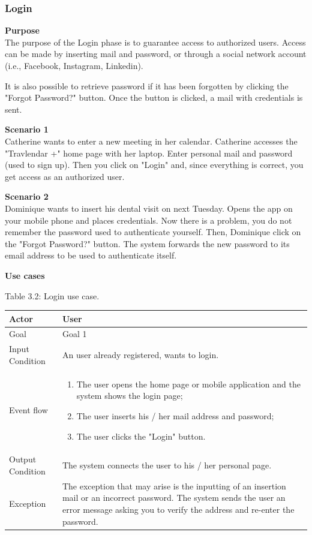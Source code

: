 \documentclass{article}
\begin{document}
	\subsubsection{Login}
	
	\bigskip
	\noindent
	\textbf{Purpose} \\
	The purpose of the Login phase is to guarantee access to authorized users. Access can be made by inserting mail and password, or through a social network account (i.e., Facebook, Instagram, Linkedin).

	It is also possible to retrieve password if it has been forgotten by clicking the "Forgot Password?" button. Once the button is clicked, a mail with credentials is sent.

	\bigskip
	\noindent
	\textbf{Scenario 1} \\
	Catherine wants to enter a new meeting in her calendar. Catherine accesses the "Travlendar +" home page with her laptop. Enter personal mail and password (used to sign up). Then you click on "Login" and, since everything is correct, you get access as an authorized user.
	
	\bigskip
	\noindent
	\textbf{Scenario 2} \\
	Dominique wants to insert his dental visit on next Tuesday. Opens the app on your mobile phone and places credentials. Now there is a problem, you do not remember the password used to authenticate yourself. Then, Dominique click on the "Forgot Password?" button. The system forwards the new password to its email address to be used to authenticate itself.
	
	\bigskip
	\noindent
	\textbf{Use cases} \\
	
	\begin{center}
		Table 3.2: Login use case.
		
		\bigskip
    		\begin{tabular}{p{}|p{}}
   			\hline
    			Actor & User \\ \hline
    			Goal & Goal 1 \\ \hline
    			Input Condition & An  user already registered, wants to login. \\ \hline
    			Event flow & 
			\begin{enumerate}
  				\item The user opens the home page or mobile application and the system shows the login page;
  				\item The user inserts his / her mail address and password;
  				\item The user clicks the "Login" button.
 			\end{enumerate} \\ \hline
    			Output Condition & The system connects the user to his / her personal page. \\ \hline
    			Exception &The exception that may arise is the inputting of an insertion mail or an incorrect password. The system sends the user an error message asking you to verify the address and re-enter the password. \\ \hline
    		\end{tabular}
	\end{center}
	
\end{document}

